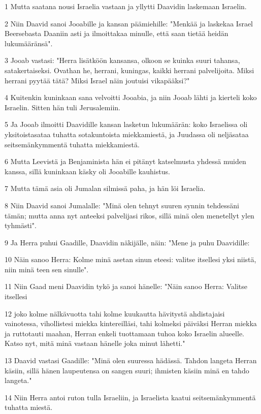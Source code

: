 \par 1 Mutta saatana nousi Israelia vastaan ja yllytti Daavidin laskemaan Israelin.
\par 2 Niin Daavid sanoi Jooabille ja kansan päämiehille: "Menkää ja laskekaa Israel Beersebasta Daaniin asti ja ilmoittakaa minulle, että saan tietää heidän lukumääränsä".
\par 3 Jooab vastasi: "Herra lisätköön kansansa, olkoon se kuinka suuri tahansa, satakertaiseksi. Ovathan he, herrani, kuningas, kaikki herrani palvelijoita. Miksi herrani pyytää tätä? Miksi Israel näin joutuisi vikapääksi?"
\par 4 Kuitenkin kuninkaan sana velvoitti Jooabia, ja niin Jooab lähti ja kierteli koko Israelin. Sitten hän tuli Jerusalemiin.
\par 5 Ja Jooab ilmoitti Daavidille kansan lasketun lukumäärän: koko Israelissa oli yksitoistasataa tuhatta sotakuntoista miekkamiestä, ja Juudassa oli neljäsataa seitsemänkymmentä tuhatta miekkamiestä.
\par 6 Mutta Leevistä ja Benjaminista hän ei pitänyt katselmusta yhdessä muiden kanssa, sillä kuninkaan käsky oli Jooabille kauhistus.
\par 7 Mutta tämä asia oli Jumalan silmissä paha, ja hän löi Israelia.
\par 8 Niin Daavid sanoi Jumalalle: "Minä olen tehnyt suuren synnin tehdessäni tämän; mutta anna nyt anteeksi palvelijasi rikos, sillä minä olen menetellyt ylen tyhmästi".
\par 9 Ja Herra puhui Gaadille, Daavidin näkijälle, näin: "Mene ja puhu Daavidille:
\par 10 Näin sanoo Herra: Kolme minä asetan sinun eteesi: valitse itsellesi yksi niistä, niin minä teen sen sinulle".
\par 11 Niin Gaad meni Daavidin tykö ja sanoi hänelle: "Näin sanoo Herra: Valitse itsellesi
\par 12 joko kolme nälkävuotta tahi kolme kuukautta hävitystä ahdistajaisi vainotessa, vihollistesi miekka kintereilläsi, tahi kolmeksi päiväksi Herran miekka ja ruttotauti maahan, Herran enkeli tuottamaan tuhoa koko Israelin alueelle. Katso nyt, mitä minä vastaan hänelle joka minut lähetti."
\par 13 Daavid vastasi Gaadille: "Minä olen suuressa hädässä. Tahdon langeta Herran käsiin, sillä hänen laupeutensa on sangen suuri; ihmisten käsiin minä en tahdo langeta."
\par 14 Niin Herra antoi ruton tulla Israeliin, ja Israelista kaatui seitsemänkymmentä tuhatta miestä.
